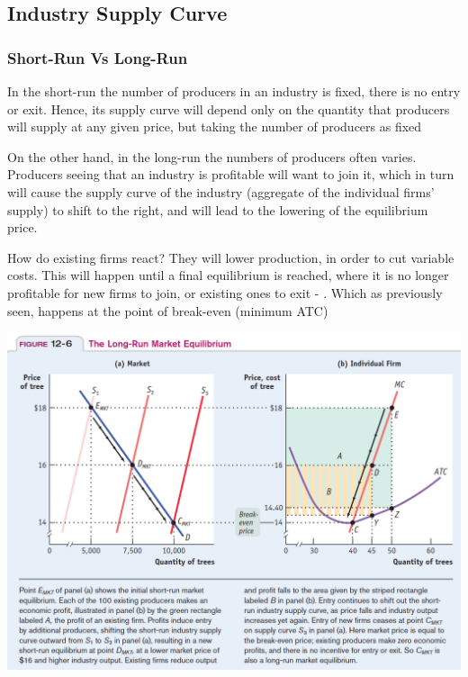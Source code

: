 \documentclass[english,course,draft]{Notes}
\begin{document}
{\newpage

\subsection{Industry Supply Curve}


\subsubsection{Short-Run Vs Long-Run}

\par{In the short-run the number of producers in an industry is fixed, there is no entry or exit. Hence, its supply curve will depend only on the quantity that producers will supply at any given price, but taking the number of producers as fixed}

\par{On the other hand, in the long-run the numbers of producers often varies. Producers seeing that an industry is profitable will want to join it, which in turn will cause the supply curve of the industry (aggregate of the individual firms' supply) to shift to the right, and will lead to the lowering of the equilibrium price.}
\par{How do existing firms react? They will lower production, in order to cut variable costs. This will happen until a final equilibrium is reached, where it is no longer profitable for new firms to join, or existing ones to exit - . Which as previously seen, happens at the point of break-even (minimum ATC)} }


\includegraphics[width=\textwidth]{longRunEntry}
\end{document}
